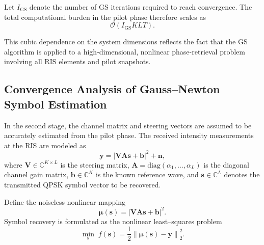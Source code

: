 \documentclass[journal]{IEEEtran}
\begin{document}
Let $I_{\mathrm{GS}}$ denote the number of GS iterations required to reach
convergence. The total computational burden in the pilot phase therefore
scales as
\begin{equation}
\mathcal O\!\left(I_{\mathrm{GS}} K L T\right).
\end{equation}

This cubic dependence on the system dimensions reflects the fact that the
GS algorithm is applied to a high-dimensional, nonlinear phase-retrieval
problem involving all RIS elements and pilot snapshots.



\subsection{Convergence Analysis of Gauss--Newton Symbol Estimation}

In the second stage, the channel matrix and steering vectors are assumed to be accurately estimated from the pilot phase. The received intensity measurements at the RIS are modeled as
%
\begin{equation}
\mathbf y
=
\left|
\mathbf V \mathbf A \mathbf s + \mathbf b
\right|^2
+
\mathbf n ,
\label{eq:symbol_model}
\end{equation}
%
where $\mathbf V\in\mathbb C^{K\times L}$ is the steering matrix, $\mathbf A=\mathrm{diag}(\alpha_1,\dots,\alpha_L)$ is the diagonal channel gain matrix, $\mathbf b\in\mathbb C^K$ is the known reference wave, and $\mathbf s\in\mathbb C^L$ denotes the transmitted QPSK symbol vector to be recovered.


Define the noiseless nonlinear mapping
%
\begin{equation}
\boldsymbol{\mu}(\mathbf s)
=
\left|
\mathbf V \mathbf A \mathbf s + \mathbf b
\right|^2 .
\end{equation}
%
Symbol recovery is formulated as the nonlinear least--squares problem
%
\begin{equation}
\min_{\mathbf s}
\;
f(\mathbf s)
=
\frac12
\left\|
\boldsymbol{\mu}(\mathbf s)-\mathbf y
\right\|_2^2 .
\label{eq:gn_cost}
\end{equation}
\end{document}
